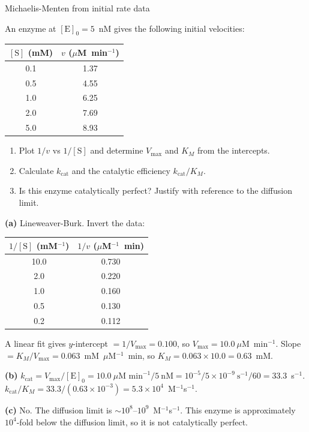 \documentclass[12pt, a4paper, oneside]{report}
\begin{document}
\begin{problem}{\enspace{}\enspace
  Michaelis-Menten from initial rate data}

  An enzyme at $[\mathrm{E}]_0 = 5$~nM gives the following
  initial velocities:

  \begin{center}
  \begin{tabular}{cc}
  \toprule
  $[\mathrm{S}]$ (mM) & $v$ ($\mu$M~min$^{-1}$) \\
  \midrule
  0.1  & 1.37 \\
  0.5  & 4.55 \\
  1.0  & 6.25 \\
  2.0  & 7.69 \\
  5.0  & 8.93 \\
  \bottomrule
  \end{tabular}
  \end{center}

  \begin{enumerate}
    \item Plot $1/v$ vs $1/[\mathrm{S}]$ and determine $V_{\max}$ and
          $K_M$ from the intercepts.
    \item Calculate $k_\text{cat}$ and the catalytic efficiency
          $k_\text{cat}/K_M$.
    \item Is this enzyme catalytically perfect? Justify with reference
          to the diffusion limit.
  \end{enumerate}
\end{problem}

\begin{solution}
  \textbf{(a)} Lineweaver-Burk. Invert the data:

  \begin{center}
  \begin{tabular}{cc}
  \toprule
  $1/[\mathrm{S}]$ (mM$^{-1}$) & $1/v$ ($\mu$M$^{-1}$~min) \\
  \midrule
  10.0 & 0.730 \\
   2.0 & 0.220 \\
   1.0 & 0.160 \\
   0.5 & 0.130 \\
   0.2 & 0.112 \\
  \bottomrule
  \end{tabular}
  \end{center}

  A linear fit gives $y$-intercept $= 1/V_{\max} = 0.100$, so
  $V_{\max} = 10.0~\mu$M~min$^{-1}$.
  Slope $= K_M/V_{\max} = 0.063$~mM~$\mu$M$^{-1}$~min, so
  $K_M = 0.063 \times 10.0 = 0.63$~mM.

  \textbf{(b)} $k_\text{cat} = V_{\max}/[\mathrm{E}]_0 =
  10.0~\mu\text{M~min}^{-1} / 5~\text{nM} =
  10^{-5}/5\times10^{-9}~\text{s}^{-1}/60 = 33.3$~s$^{-1}$.\\
  $k_\text{cat}/K_M = 33.3 / (0.63\times10^{-3}) = 5.3\times10^4$~M$^{-1}$s$^{-1}$.

  \textbf{(c)} No. The diffusion limit is $\sim10^8$--$10^9$~M$^{-1}$s$^{-1}$.
  This enzyme is approximately $10^4$-fold below the diffusion limit,
  so it is not catalytically perfect.
\end{solution}
\end{document}
